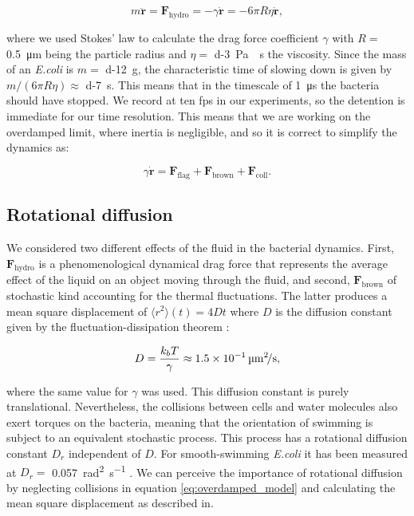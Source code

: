 \begin{equation}
	m\ddot{\textbf{r}} = \textbf{F}_{\text{hydro}} = -\gamma \dot{\textbf{r}} = - 6 \pi R \eta \dot{\textbf{r}},
\end{equation}

where we used Stokes' law to calculate the drag force coefficient $\gamma$ with $R=$ \SI{0.5}{\micro\meter} being the particle radius and $\eta=$ \SI{d-3}{\pascal\cdot\second} the viscosity. Since the mass of an \textit{E.coli} is $m=$ \SI{d-12}{\gram}, the characteristic time of slowing down is given by $ m/(6 \pi R \eta) \approx $ \SI{d-7}{\second}. This means that in the timescale of \SI{1}{\micro\second} the bacteria should have stopped. We record at ten fps in our experiments, so the detention is immediate for our time resolution. This means that we are working on the overdamped limit, where inertia is negligible, and so it is correct to simplify the dynamics as:

\begin{equation} \label{eq:overdamped_model}
	\gamma \dot{\textbf{r}} = \textbf{F}_{\text{flag}} + \textbf{F}_{\text{brown}} + \textbf{F}_{\text{coll}}.
\end{equation}

\subsection{Rotational diffusion}

We considered two different effects of the fluid in the bacterial dynamics. First, $\textbf{F}_{\text{hydro}}$ is a phenomenological dynamical drag force that represents the average effect of the liquid on an object moving through the fluid, and second, $\textbf{F}_{\text{brown}}$ of stochastic kind accounting for the thermal fluctuations. The latter produces a mean square displacement of $\langle r^2 \rangle (t) = 4 D t $ where $D$ is the diffusion constant given by the fluctuation-dissipation theorem \cite{Soto2016KineticPhenomena}:

\begin{equation}
	D = \frac{k_bT}{\gamma} \approx \SI[per-mode = symbol]{1.5d-1}{\square\micro\meter \per \second},
\end{equation}
 
where the same value for $\gamma$ was used. This diffusion constant is purely translational. Nevertheless, the collisions between cells and water molecules also exert torques on the bacteria, meaning that the orientation of swimming is subject to an equivalent stochastic process. This process has a rotational diffusion constant $D_r$ independent of $D$. For smooth-swimming \textit{E.coli} it has been measured at $D_r=$ \SI[per-mode = symbol]{0.057}{\square\radian \per \second} \cite{Drescher2011FluidScattering}. We can perceive the importance of rotational diffusion by neglecting collisions in equation \eqref{eq:overdamped_model} and calculating the mean square displacement as described in\cite{Lauga2020TheMotility}.

